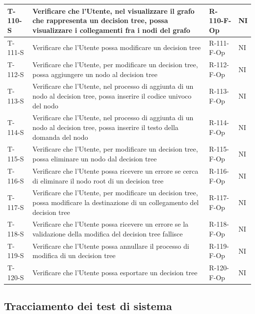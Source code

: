 \documentclass[a4paper,12pt]{article}
\begin{document}
{{\begin{longtable}{|p{}|p{}|p{}|p{}|}
                T-110-S & Verificare che l'Utente, nel visualizzare il grafo che rappresenta un decision tree, possa visualizzare i collegamenti fra i nodi del grafo & R-110-F-Op & NI \\ \hline
                T-111-S & Verificare che l'Utente possa modificare un decision tree & R-111-F-Op & NI \\ \hline
                T-112-S & Verificare che l'Utente, per modificare un decision tree, possa aggiungere un nodo al decision tree & R-112-F-Op & NI \\ \hline
                T-113-S & Verificare che l'Utente, nel processo di aggiunta di un nodo al decision tree, possa inserire il codice univoco del nodo & R-113-F-Op & NI \\ \hline
                T-114-S & Verificare che l'Utente, nel processo di aggiunta di un nodo al decision tree, possa inserire il testo della domanda del nodo & R-114-F-Op & NI \\ \hline
                T-115-S & Verificare che l'Utente, per modificare un decision tree, possa eliminare un nodo dal decision tree & R-115-F-Op & NI \\ \hline
                T-116-S & Verificare che l'Utente possa ricevere un errore se cerca di eliminare il nodo root di un decision tree & R-116-F-Op & NI \\ \hline
                T-117-S & Verificare che l'Utente, per modificare un decision tree, possa modificare la destinazione di un collegamento del decision tree & R-117-F-Op & NI \\ \hline
                T-118-S & Verificare che l'Utente possa ricevere un errore se la validazione della modifica del decision tree fallisce & R-118-F-Op & NI \\ \hline
                T-119-S & Verificare che l'Utente possa annullare il processo di modifica di un decision tree & R-119-F-Op & NI \\ \hline
                T-120-S & Verificare che l'Utente possa esportare un decision tree & R-120-F-Op & NI \\ \hline
            \end{longtable}
         
    }

    \subsection{Tracciamento dei test di sistema}{

        \setlength{\LTleft}{\fill}
        \setlength{\LTright}{\fill}
        
}}
\end{document}
